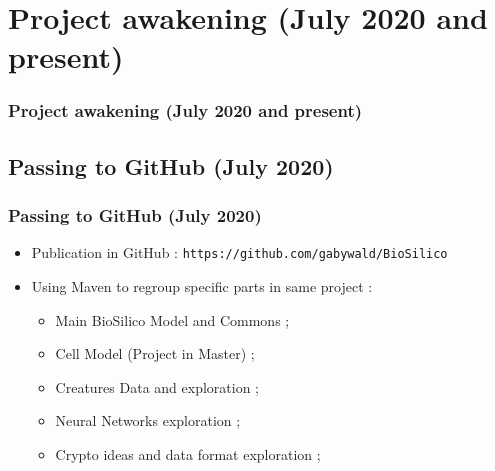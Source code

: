 \documentclass{beamer}
\begin{document}

\def\titleSectionThirdPart{Project awakening (July 2020 and present)}
\section{\titleSectionThirdPart }
\begin{frame}
	\frametitle{\titleSectionThirdPart }
	\tableofcontents[sections=3,currentsection,subsectionstyle=show/shaded/hide]
\end{frame} 

\def\titleSubSectionThirdPartOne{ Passing to GitHub (July 2020) }
\subsection{ \titleSubSectionThirdPartOne }
\begin{frame}
	\frametitle{ \titleSubSectionThirdPartOne }
	\begin{itemize}
		\item Publication in GitHub : \texttt{https://github.com/gabywald/BioSilico}
		\item Using Maven to regroup specific parts in same project : 
		\begin{itemize}
			\item Main BioSilico Model and Commons ; 
			\item Cell Model (Project in Master) ; 
			\item Creatures Data and exploration ; 
			\item Neural Networks exploration ; 
			\item Crypto ideas and data format exploration ; 
		\end{itemize}
	\end{itemize}
\end{frame}

\def\titleSubSectionThirdPartTwo{ Implementations and Ideas to come }
\end{document}
